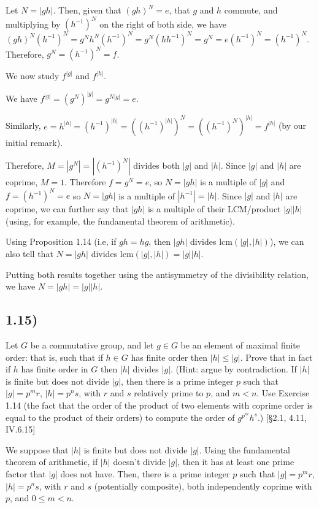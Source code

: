 Let $N = |gh|$. Then, given that $(gh)^N = e$, that $g$ and $h$ commute, and multiplying by $(h^{-1})^N$ on the right of both side, we have $(gh)^N(h^{-1})^N = g^N h^N (h^{-1})^N = g^N (hh^{-1})^N = g^N = e(h^{-1})^N = (h^{-1})^N$. Therefore, $g^N = (h^{-1})^N = f$.

We now study $f^{|g|}$ and $f^{|h|}$.

We have $f^{|g|} = (g^N)^{|g|} = g^{N|g|} = e$.

Similarly, $e = h^{|h|} = (h^{-1})^{|h|} = ((h^{-1})^{|h|})^N = ((h^{-1})^N)^{|h|} = f^{|h|}$ (by our initial remark).

Therefore, $M = |g^N| = |(h^{-1})^N|$ divides both $|g|$ and $|h|$. Since $|g|$ and $|h|$ are coprime, $M = 1$. Therefore $f = g^N = e$, so $N = |gh|$ is a multiple of $|g|$ and $f = (h^{-1})^N = e$ so $N = |gh|$ is a multiple of $|h^{-1}| = |h|$. Since $|g|$ and $|h|$ are coprime, we can further say that $|gh|$ is a multiple of their LCM/product $|g||h|$ (using, for example, the fundamental theorem of arithmetic).

Using Proposition 1.14 (i.e, if $gh = hg$, then $|gh|$ divides $\text{lcm}(|g|, |h|)$), we can also tell that $N = |gh|$ divides $\text{lcm}(|g|, |h|) = |g| |h|$.

Putting both results together using the antisymmetry of the divisibility relation, we have $N = |gh| = |g||h|$.



\subsection*{1.15)}

Let $G$ be a commutative group, and let $g \in G$ be an element of maximal finite order: that is, such that if $h \in G$ has finite order then $|h| \leq |g|$. Prove that in fact if $h$ has finite order in $G$ then $|h|$ divides $|g|$. (Hint: argue by contradiction. If $|h|$ is finite but does not divide $|g|$, then there is a prime integer $p$ such that $|g| = p^m r$, $|h| = p^n s$, with $r$ and $s$ relatively prime to $p$, and $m < n$. Use Exercise 1.14 (the fact that the order of the product of two elements with coprime order is equal to the product of their orders) to compute the order of $g^{p^m} h^s$.) [§2.1, 4.11, IV.6.15]

We suppose that $|h|$ is finite but does not divide $|g|$. Using the fundamental theorem of arithmetic, if $|h|$ doesn't divide $|g|$, then it has at least one prime factor that $|g|$ does not have. Then, there is a prime integer $p$ such that $|g| = p^m r$, $|h| = p^n s$, with $r$ and $s$ (potentially composite), both independently coprime with $p$, and $0 \leq m < n$.

